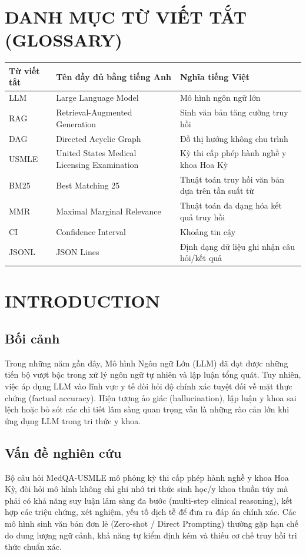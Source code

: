 \vspace{0.5cm}

\section*{DANH MỤC TỪ VIẾT TẮT (GLOSSARY)}
\begin{table}[h!]
\centering
\begin{tabular}{lll}
\toprule
\textbf{Từ viết tắt} & \textbf{Tên đầy đủ bằng tiếng Anh} & \textbf{Nghĩa tiếng Việt} \\
\midrule
LLM & Large Language Model & Mô hình ngôn ngữ lớn \\
RAG & Retrieval-Augmented Generation & Sinh văn bản tăng cường truy hồi \\
DAG & Directed Acyclic Graph & Đồ thị hướng không chu trình \\
USMLE & United States Medical Licensing Examination & Kỳ thi cấp phép hành nghề y khoa Hoa Kỳ \\
BM25 & Best Matching 25 & Thuật toán truy hồi văn bản dựa trên tần suất từ \\
MMR & Maximal Marginal Relevance & Thuật toán đa dạng hóa kết quả truy hồi \\
CI & Confidence Interval & Khoảng tin cậy \\
JSONL & JSON Lines & Định dạng dữ liệu ghi nhận câu hỏi/kết quả \\
\bottomrule
\end{tabular}
\end{table}

\newpage

\section{INTRODUCTION}

\subsection{Bối cảnh}
Trong những năm gần đây, Mô hình Ngôn ngữ Lớn (LLM) đã đạt được những tiến bộ vượt bậc trong xử lý ngôn ngữ tự nhiên và lập luận tổng quát. Tuy nhiên, việc áp dụng LLM vào lĩnh vực y tế đòi hỏi độ chính xác tuyệt đối về mặt thực chứng (factual accuracy). Hiện tượng ảo giác (hallucination), lập luận y khoa sai lệch hoặc bỏ sót các chi tiết lâm sàng quan trọng vẫn là những rào cản lớn khi ứng dụng LLM trong tri thức y khoa.

\subsection{Vấn đề nghiên cứu}
Bộ câu hỏi MedQA-USMLE mô phỏng kỳ thi cấp phép hành nghề y khoa Hoa Kỳ, đòi hỏi mô hình không chỉ ghi nhớ tri thức sinh học/y khoa thuần túy mà phải có khả năng suy luận lâm sàng đa bước (multi-step clinical reasoning), kết hợp các triệu chứng, xét nghiệm, yếu tố dịch tễ để đưa ra đáp án chính xác. Các mô hình sinh văn bản đơn lẻ (Zero-shot / Direct Prompting) thường gặp hạn chế do dung lượng ngữ cảnh, khả năng tự kiểm định kém và thiếu cơ chế truy hồi tri thức chuẩn xác.

